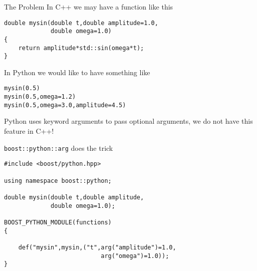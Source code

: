 
\begin{frame}[fragile]{The Problem}
    In C++ we may have a function like this 
    \begin{verbatim}
double mysin(double t,double amplitude=1.0,
             double omega=1.0)
{
    return amplitude*std::sin(omega*t);
}
    \end{verbatim}
    \vspace{0.05\textheight}
    In Python we would like to have something like 
    \begin{verbatim}
mysin(0.5)
mysin(0.5,omega=1.2)
mysin(0.5,omega=3.0,amplitude=4.5)
    \end{verbatim}
    \vspace{0.025\textheight}
    Python uses keyword arguments to pass optional arguments, we do not have
    this feature in C++!
\end{frame}

\begin{frame}[fragile]{\texttt{boost::python::arg} does the trick}
    \begin{verbatim}
#include <boost/python.hpp>

using namespace boost::python; 

double mysin(double t,double amplitude,
             double omega=1.0);

BOOST_PYTHON_MODULE(functions)
{

    def("mysin",mysin,("t",arg("amplitude")=1.0,
                           arg("omega")=1.0));
}


    \end{verbatim}
\end{frame}

